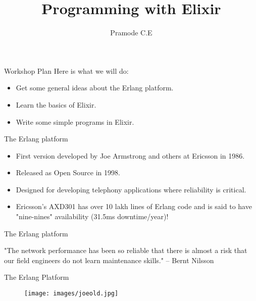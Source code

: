 \documentclass{beamer}
\title{Programming with Elixir}
\author{Pramode C.E}
\institute {
  \texttt{http://pramode.net}
}
\begin{document}

\begin{frame}[plain]
  \titlepage
\end{frame}


\begin{frame}{Workshop Plan}
Here is what we will do:

\begin{itemize}
  \item Get some general ideas about the Erlang platform.
  \item Learn the basics of Elixir.
  \item Write some simple programs in Elixir.
\end{itemize}

\end{frame}


\begin{frame}{The Erlang platform}

\begin{itemize}
   \item First version developed by Joe Armstrong and others at Ericsson in 1986.
   \item Released as Open Source in 1998.
   \item Designed for developing telephony applications where reliability is critical.
   \item Ericsson's AXD301 has over 10 lakh lines of Erlang code and is said to have
         "nine-nines" availability (31.5ms downtime/year)!
\end{itemize}

\end{frame}

\begin{frame}{The Erlang platform}

"The network performance has been so reliable that there is almost a 
risk that our field engineers do not learn maintenance skills." -- Bernt Nilsson


\end{frame}

\begin{frame}{The Erlang Platform}

\begin{figure}
\texttt{[image: images/joeold.jpg]}
\end{figure}

\end{frame}
\end{document}
